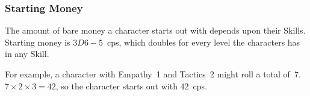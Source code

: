 \begin{multicols}{2}
\subsubsection{Starting Money}

The amount of bare money a character starts out with depends upon their Skills.
Starting money is $3D6-5$~\glspl{cp}, which doubles for every level the characters has in any Skill.

For example, a character with Empathy~1 and Tactics~2 might roll a total of~7.
$7\times2\times3 = 42$, so the character starts out with 42~\glspl{cp}.

\end{multicols}

\renewcommand\csComments{
    \commentary{[xshift=22,yshift=-9em]TCBPOSTER@title.north}{-2em,2em}{{\huge\ref{sumCCconcept}} Select a two-word concept.}

    \commentary{[xshift=3em,yshift=0em]TCBPOSTER@attributes.south east}{-3em,2.8em}{{\huge\ref{sumCCatt}:} Adjust Attributes with the racial bonuses (\autopageref{raceRoll}).}

    \commentary{[xshift=15em,yshift=-6em]TCBPOSTER@title.west}{-2em,2em}{{\huge\ref{sumCCrace}:} Write a name and race.}

    \commentary{[xshift=-4em,yshift=-1em]TCBPOSTER@armoury.north east}{-18em,10em}{}
    \commentary{[xshift=-4em,yshift=0em]TCBPOSTER@armoury.north east}{1em,-23em}{}
    \commentary{[xshift=-4em,yshift=0em]TCBPOSTER@armoury.north east}{-4em,6.5em}{{\huge\ref{sumCCxp}:} Spend 50 \glspl{xp} to purchase Attributes, Skills, and Knacks.}

    \commentary{[xshift=0em,yshift=1em]TCBPOSTER@equipment.south}{0em,0em}{{\huge\ref{sumCCcoin}:} Note starting money, if any.}

    \commentary{[xshift=-7em,yshift=-4em]TCBPOSTER@title.east}{-2em,1em}{{\huge\ref{sumCCcode}:} Select a Code (\autopageref{codes}) and culture.}

    \commentary{[xshift=3em,yshift=2em]TCBPOSTER@derived.south}{0em,0em}{{\huge\ref{sumCCder}:} Fill in the derived stats.}

    \commentary{[xshift=5em,yshift=5em]TCBPOSTER@armoury.south west}{4em,-22em}{}
    \commentary{[xshift=5em,yshift=5em]TCBPOSTER@armoury.south west}{4em,.5em}{{\huge\ref{sumCCequip}:} Take a number of items equal to your total Skills, then fill in any stats for weapons and armour (\autopageref{commonWeapons}).}
}



